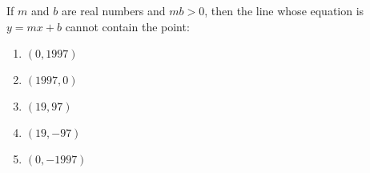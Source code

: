 If $m$ and $b$ are real numbers and $mb>0$, then the line whose equation is $y=mx+b$ cannot contain the point:
\begin{enumerate}
\item $(0,1997)$
\item $(1997,0)$
\item $(19,97)$
\item $(19,-97)$
\item $(0,-1997)$
\end{enumerate}
